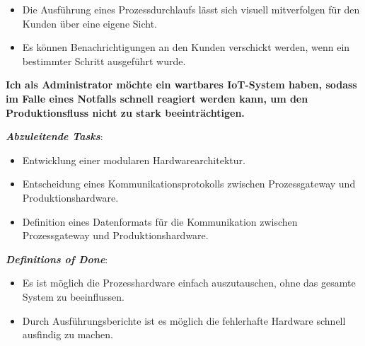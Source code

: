 \begin{itemize}
    \item Die Ausführung eines Prozessdurchlaufs lässt sich visuell mitverfolgen für den Kunden über eine eigene Sicht.
    \item Es können Benachrichtigungen an den Kunden verschickt werden, wenn ein bestimmter Schritt ausgeführt wurde.
\end{itemize}


\noindent \textbf{Ich als Administrator möchte ein wartbares IoT-System haben, sodass im Falle eines Notfalls schnell reagiert werden kann, um den Produktionsfluss nicht zu stark beeinträchtigen.}

\textbf{\textit{Abzuleitende Tasks}}:

\begin{itemize}
    \item Entwicklung einer modularen Hardwarearchitektur.
    \item Entscheidung eines Kommunikationsprotokolls zwischen Prozessgateway und Produktionshardware.
    \item Definition eines Datenformats für die Kommunikation zwischen Prozessgateway und Produktionshardware.
\end{itemize}

\textbf{\textit{Definitions of Done}}:

\begin{itemize}
    \item Es ist möglich die Prozesshardware einfach auszutauschen, ohne das gesamte System zu beeinflussen.
    \item Durch Ausführungsberichte ist es möglich die fehlerhafte Hardware schnell ausfindig zu machen.
\end{itemize}
